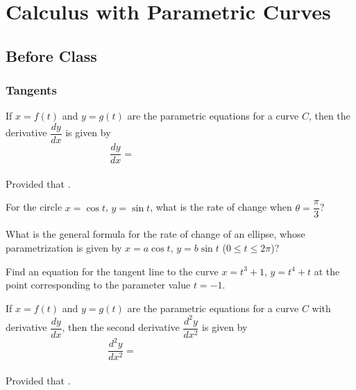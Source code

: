 \documentclass[notes2924]{subfiles}
\begin{document}
	\fancyhead[LO,RE]{\bfseries \small \currentname}
	\fancyfoot[C]{{}}
	\fancyfoot[RO,LE]{\large \thepage}	%
	
\section*{Calculus with Parametric Curves}\label{cs102}
	\subsection*{Before Class}
	\subsubsection*{Tangents}
		\begin{rmk}
			If $x = f(t)$ and $y = g(t)$ are the parametric equations for a curve $C$, then the derivative $\dfrac{dy}{dx}$ is given by 
				\[\dfrac{dy}{dx} = \hspace{2in}\]
				\\[20pt]
			Provided that .
		\end{rmk}
		\begin{pf}
		
		\end{pf}
			\vspace{1.5in}
			
		\begin{ex}
			For the circle $x = \cos t$, $y = \sin t$, what is the rate of change when $\theta = \dfrac{\pi}{3}$?
		\end{ex}
			
		\begin{ex}
			What is the general formula for the rate of change of an ellipse, whose parametrization is given by $x = a\cos t$, $y = b\sin t$ ($0\leq t\leq 2\pi$)?
		\end{ex}
			\newpage
		
		\begin{ex}
			Find an equation for the tangent line to the curve $x = t^3 + 1$, $y = t^4 + t$ at the point corresponding to the parameter value $t = -1$.  
		\end{ex}	
			
		\begin{rmk}
			If $x = f(t)$ and $y = g(t)$ are the parametric equations for a curve $C$ with derivative $\dfrac{dy}{dx}$, then the second derivative $\dfrac{d^2y}{dx^2}$ is given by 
				\[\dfrac{d^2y}{dx^2} = \hspace{2in}\]
				\\[20pt]
			Provided that .
		\end{rmk}
		\begin{pf}
		
		\end{pf}
			\vspace{1.5in}
			
\end{document}
